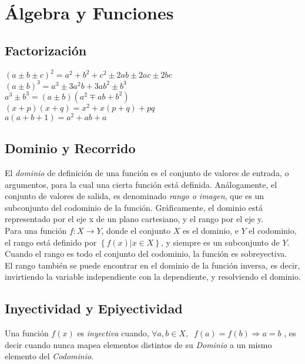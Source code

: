 \section{Álgebra y Funciones}
\def\svgwidth{\columnwidth}

\subsection{Factorización}
$ (a \pm b \pm c)^2 = a^2 + b^2 + c^2 \pm 2ab \pm 2ac \pm 2bc $\\
$(a \pm b)^3 = a^3 \pm 3a^2b + 3ab^2 \pm b^3$\\
$ a^3 \pm b^3 = (a \pm b)(a^2 \mp ab + b^2)$\\
$ (x + p)(x + q) = x^2 + x(p + q) + pq $\\
$ a (a + b + 1) = a^2 + ab + a $\\

\subsection{Dominio y Recorrido}
El \textit{dominio} de definición de una función es el conjunto de valores de entrada, o argumentos, para la cual una cierta función está definida. Análogamente, el conjunto de valores de salida, es denominado \textit{rango o imagen}, que es un subconjunto del codominio de la función. Gráficamente, el dominio está representado por el eje x de un plano cartesiano, y el rango por el eje y.\\

Para una función $f: X \rightarrow Y$, donde el conjunto $X$ es el dominio, e $Y$ el codominio, el rango está definido por $\left\{ f(x) | x \in X \right\}$, y siempre es un subconjunto de $Y$. Cuando el rango es todo el conjunto del codominio, la función es sobreyectiva.\\

El rango también se puede encontrar en el dominio de la función inversa, es decir, invirtiendo la variable independiente con la dependiente, y resolviendo el dominio.\\

\subsection{Inyectividad y Epiyectividad}
Una función $f(x)$ es \textit{inyectiva} cuando,
$\forall a,b \in X, \;\; f(a)=f(b) \Rightarrow a=b$
, es decir cuando nunca mapea elementos distintos de su \textit{Dominio} a un mismo elemento del \textit{Codominio}.

